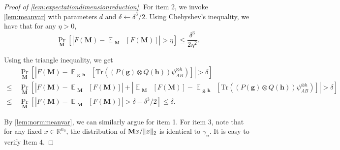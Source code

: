 \documentclass[10pt,a4paper]{article}
\theoremstyle{plain}
\theoremstyle{definition}
\newcommand {\minusspace} {\: \! \!}
\newcommand {\Fn} [2] {\ensuremath{ #1 \minusspace \Br{ #2 } }}
\newcommand{\reals}{{\mathbb R}}
\newcommand {\br} [1] {\ensuremath{ \left( #1 \right) }}
\newcommand {\Br} [1] {\ensuremath{ \left[ #1 \right] }}
\DeclarePairedDelimiter{\norm}{\lVert}{\rVert}
\newcommand {\ab} [1] {\ensuremath{ \left| #1 \right| }}
\DeclareMathOperator*{\bigE}{\mathbb{E}}
\newcommand {\expec} [2] {\Fn{\bigE_{\substack{#1}}}{#2}}
\newcommand {\Tr} {\ensuremath{ \mathrm{Tr} }}
\newcommand{\randg}{\ensuremath{\mathbf{g}}}
\newcommand{\randh}{\ensuremath{\mathbf{h}}}
\newcommand{\randM}{\ensuremath{\mathbf{M}}}
\newcommand{\1}{\mathbb{1}} %
\begin{document}
\begin{proof}[Proof of \cref{lem:expectationdimensionreduction}]


For item 2, we invoke \cref{lem:meanvar} with parameters $d$ and $\delta\leftarrow\delta^3/2$. 
 Using Chebyshev's inequality, we have that for any $\eta>0$,
\[\Pr_{\mathbf{M}}\Br{\ab{F(\mathbf{M})-\expec{\mathbf{M}}{F(\mathbf{M})}}>\eta}\leq\frac{\delta^3}{2\eta^2}.\]

Using the triangle inequality, we get
\begin{align*}
&\Pr_{\mathbf{M}}\Br{\ab{F(\mathbf{M})-\expec{\mathbf{g},\mathbf{h}}{\Tr\br{\br{P(\randg)\otimes Q(\randh)}\psi_{AB}^{\otimes h}}}}>\delta}\\
\leq~&\Pr_{\mathbf{M}}\Br{\ab{F(\mathbf{M})-\expec{\mathbf{M}}{F(\mathbf{M})}}+\ab{\expec{\mathbf{M}}{F(\mathbf{M})}-\expec{\mathbf{g},\mathbf{h}}{\Tr\br{\br{P(\randg)\otimes Q(\randh)}\psi_{AB}^{\otimes h}}}}>\delta}\\
\leq~&\Pr_{\mathbf{M}}\Br{\ab{F(\mathbf{M})-\expec{\mathbf{M}}{F(\mathbf{M})}}>\delta-\delta^3/2}\leq\delta.
\end{align*}

By \cref{lem:normmeanvar}, we can similarly argue for item 1. For item 3, note that for any fixed $x\in\reals^{n_0}$, the distribution of $\randM x/\norm{x}_2$ is identical to $\gamma_{n}$.
	It is easy to verify Item 4.
\end{proof}
\end{document}
